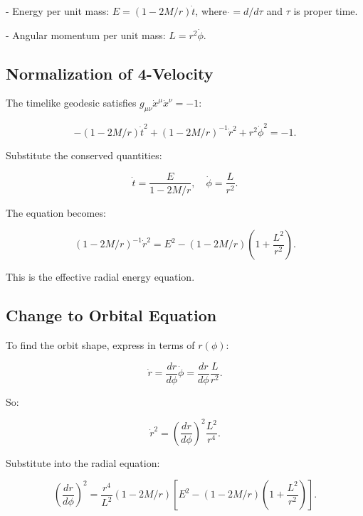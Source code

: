 \documentclass{article}
\begin{document}
- Energy per unit mass: \( E = (1 - 2M/r) \dot{t} \), where \(\dot{} = d/d\tau\) and \(\tau\) is proper time.

- Angular momentum per unit mass: \( L = r^2 \dot{\phi}\).

\subsection{Normalization of 4-Velocity}

The timelike geodesic satisfies \(g_{\mu\nu} \dot{x}^\mu \dot{x}^\nu = -1\):

\begin{equation}
 - (1 - 2M/r) \dot{t}^2 + (1 - 2M/r)^{-1} \dot{r}^2 + r^2 \dot{\phi}^2 = -1.
\end{equation}

Substitute the conserved quantities:

\begin{equation}
\dot{t} = \frac{E}{1 - 2M/r}, \quad \dot{\phi} = \frac{L}{r^2}.
\end{equation}

The equation becomes:

\begin{equation}
 (1 - 2M/r)^{-1} \dot{r}^2 = E^2 - (1 - 2M/r) \left(1 + \frac{L^2}{r^2}\right).
\end{equation}

This is the effective radial energy equation.

\subsection{Change to Orbital Equation}

To find the orbit shape, express in terms of \(r(\phi)\):

\begin{equation}
 \dot{r} = \frac{dr}{d\phi} \dot{\phi} = \frac{dr}{d\phi} \frac{L}{r^2}.
\end{equation}

So:

\begin{equation}
 \dot{r}^2 = \left(\frac{dr}{d\phi}\right)^2 \frac{L^2}{r^4}.
\end{equation}

Substitute into the radial equation:

\begin{equation}
 \left(\frac{dr}{d\phi}\right)^2 = \frac{r^4}{L^2} (1 - 2M/r) \left[ E^2 - (1 - 2M/r) \left(1 + \frac{L^2}{r^2}\right) \right].
\end{equation}
\end{document}
